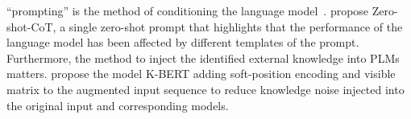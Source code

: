 ``prompting'' is the method of conditioning the language model~\citet{pengfeiliu}. \citet{kojima_large_2022} propose Zero-shot-CoT, a single zero-shot prompt that highlights that the performance of the language model has been affected by different templates of the prompt.
Furthermore, the method to inject the identified external knowledge into PLMs matters. \citet{liu_k-bert_2020} propose the model K-BERT adding soft-position encoding and visible matrix to the augmented input sequence to reduce knowledge noise injected into the original input and corresponding models. 

